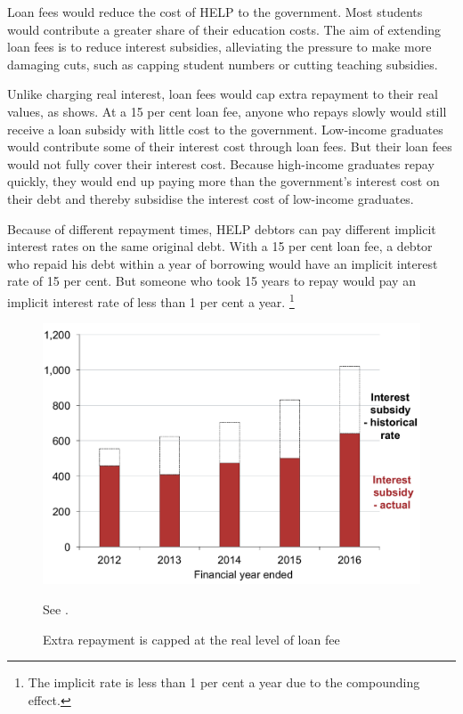 \documentclass[embargoed]{grattan}
\begin{document}
Loan fees would reduce the cost of \gls{HELP} to the government.
Most students would contribute a greater share of their education costs.
The aim of extending loan fees is to reduce interest subsidies, alleviating the pressure to make more damaging cuts, such as capping student numbers or cutting teaching subsidies.

Unlike charging real interest, loan fees would cap extra repayment to their real values, as  shows.
At a 15 per cent loan fee, anyone who repays slowly would still receive a loan subsidy with little cost to the government.
Low-income graduates would contribute some of their interest cost through loan fees.
But their loan fees would not fully cover their interest cost.
Because high-income graduates repay quickly, they would end up paying more than the government's interest cost on their debt and thereby subsidise the interest cost of low-income graduates.

Because of different repayment times, \gls{HELP} debtors can pay different implicit interest rates on the same original debt.
With a 15 per cent loan fee, a debtor who repaid his debt within a year of borrowing would have an implicit interest rate of 15 per cent.
But someone who took 15 years to repay would pay an implicit interest rate of less than 1 per cent a year.%
\footnote{The implicit rate is less than 1 per cent a year due to the compounding effect.}

\begin{figure}
\caption{Extra repayment is capped at the real level of loan fee}\label{fig:fig22-extra-repayment-capped-at-real-level-of-loan-fee}

\includegraphics[page=22]{atlas/Chartpack.pdf}

{See .}
\end{figure}
\end{document}
